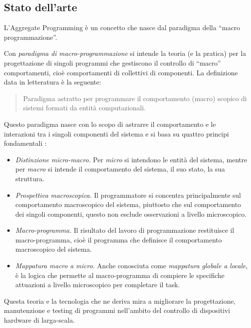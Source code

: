 \documentclass[12pt,a4paper,openright,twoside]{book}
\begin{document}
\subsection{Stato dell'arte}

L'Aggregate Programming è un concetto che nasce dal paradigma della ``macro programmazione''.

Con \textit{paradigma di macro-programmazione} si intende la teoria (e la pratica) per la progettazione di singoli programmi che gestiscono il controllo di ``macro'' comportamenti, cioè comportamenti di collettivi di componenti. La definizione data in letteratura è  la seguente:

\begin{quote}
    Paradigma astratto per programmare il comportamento (macro) scopico di sistemi formati da entità computazionali.
\end{quote}

Questo paradigma nasce con lo scopo di astrarre il comportamento e le interazioni tra i singoli componenti del sistema e si basa su quattro principi fondamentali \cite{Casadei2023}:

\begin{itemize}
    \item \textit{Distinzione micro-macro.} Per \textit{micro} si intendono le entità del sistema, mentre per \textit{macro} si intende il comportamento del sistema, il suo stato, la sua struttura.
    \item \textit{Prospettiva macroscopica.} Il programmatore si concentra principalmente sul comportamento macroscopico del sistema, piuttosto che sul comportamento dei singoli componenti, questo non esclude osservazioni a livello microscopico.
    \item \textit{Macro-programma.} Il risultato del lavoro di programmazione restituisce il macro-programma, cioè il programma che definisce il comportamento macroscopico del sistema.
    \item \textit{Mappatura macro a micro.} Anche conosciuta come \textit{mappatura globale a locale}, è la logica che permette al macro-programma di compiere le specifiche attuazioni a livello microscopico per completare il task.
\end{itemize}

Questa teoria e la tecnologia che ne deriva mira a migliorare la progettazione, manutenzione e testing di programmi nell'ambito del controllo di dispositivi hardware di larga-scala. 
\end{document}
